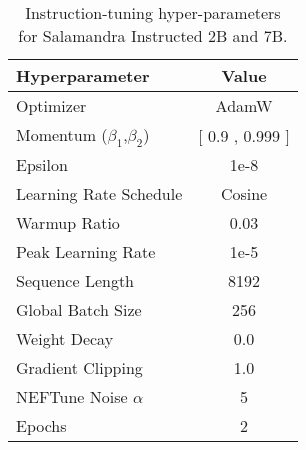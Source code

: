 \begin{table}[ht!]
\centering
\small
\begin{tabular}{lc}
\toprule
Hyperparameter & Value \\
\midrule
Optimizer & AdamW \\
Momentum ($\beta_1$,$\beta_2$) & [ 0.9 , 0.999 ] \\
Epsilon & 1e-8 \\
Learning Rate Schedule & Cosine \\
Warmup Ratio & 0.03 \\
Peak Learning Rate & 1e-5 \\
Sequence Length & 8192 \\
Global Batch Size & 256 \\
Weight Decay & 0.0 \\
Gradient Clipping & 1.0  \\
NEFTune Noise $\alpha$ & 5 \\
Epochs & 2  \\ \bottomrule
\end{tabular}
\caption{Instruction-tuning hyper-parameters\\ for Salamandra Instructed 2B and 7B.}
\label{tab:sft_params}
\end{table}